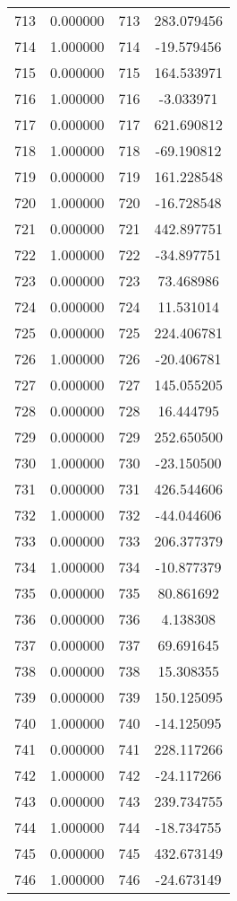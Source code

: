 \documentclass[12pt]{article}
\begin{document}
\begin{longtable}{@{}cccc@{}}
713 & 0.000000 & 713 & 283.079456 \\
714 & 1.000000 & 714 & -19.579456 \\
715 & 0.000000 & 715 & 164.533971 \\
716 & 1.000000 & 716 & -3.033971 \\
717 & 0.000000 & 717 & 621.690812 \\
718 & 1.000000 & 718 & -69.190812 \\
719 & 0.000000 & 719 & 161.228548 \\
720 & 1.000000 & 720 & -16.728548 \\
721 & 0.000000 & 721 & 442.897751 \\
722 & 1.000000 & 722 & -34.897751 \\
723 & 0.000000 & 723 & 73.468986 \\
724 & 0.000000 & 724 & 11.531014 \\
725 & 0.000000 & 725 & 224.406781 \\
726 & 1.000000 & 726 & -20.406781 \\
727 & 0.000000 & 727 & 145.055205 \\
728 & 0.000000 & 728 & 16.444795 \\
729 & 0.000000 & 729 & 252.650500 \\
730 & 1.000000 & 730 & -23.150500 \\
731 & 0.000000 & 731 & 426.544606 \\
732 & 1.000000 & 732 & -44.044606 \\
733 & 0.000000 & 733 & 206.377379 \\
734 & 1.000000 & 734 & -10.877379 \\
735 & 0.000000 & 735 & 80.861692 \\
736 & 0.000000 & 736 & 4.138308 \\
737 & 0.000000 & 737 & 69.691645 \\
738 & 0.000000 & 738 & 15.308355 \\
739 & 0.000000 & 739 & 150.125095 \\
740 & 1.000000 & 740 & -14.125095 \\
741 & 0.000000 & 741 & 228.117266 \\
742 & 1.000000 & 742 & -24.117266 \\
743 & 0.000000 & 743 & 239.734755 \\
744 & 1.000000 & 744 & -18.734755 \\
745 & 0.000000 & 745 & 432.673149 \\
746 & 1.000000 & 746 & -24.673149 \\

\end{longtable}
\end{document}
